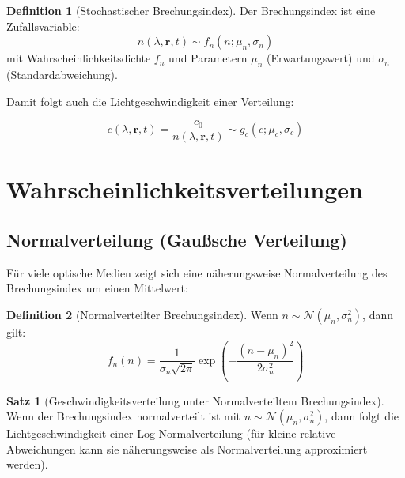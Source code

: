 \documentclass[12pt,a4paper,oneside]{article}
\theoremstyle{definition}
\newtheorem{definition}{Definition}[section]
\newtheorem{satz}{Satz}[section]
\theoremstyle{remark}
\newcommand{\cLight}{c}
\newcommand{\refIndex}{n}
\begin{document}
\begin{definition}[Stochastischer Brechungsindex]
Der Brechungsindex ist eine Zufallsvariable:
\begin{equation}
    \refIndex(\lambda, \mathbf{r}, t) \sim f_{\refIndex}(n; \mu_n, \sigma_n)
\end{equation}
mit Wahrscheinlichkeitsdichte $f_{\refIndex}$ und Parametern $\mu_n$ (Erwartungswert) und $\sigma_n$ (Standardabweichung).
\end{definition}

Damit folgt auch die Lichtgeschwindigkeit einer Verteilung:

\begin{equation}
    \cLight(\lambda, \mathbf{r}, t) = \frac{\cLight_0}{\refIndex(\lambda, \mathbf{r}, t)} \sim g_{\cLight}(c; \mu_c, \sigma_c)
\end{equation}

\section{Wahrscheinlichkeitsverteilungen}

\subsection{Normalverteilung (Gaußsche Verteilung)}

Für viele optische Medien zeigt sich eine näherungsweise Normalverteilung des Brechungsindex um einen Mittelwert:

\begin{definition}[Normalverteilter Brechungsindex]
Wenn $\refIndex \sim \mathcal{N}(\mu_n, \sigma_n^2)$, dann gilt:
\begin{equation}
    f_{\refIndex}(n) = \frac{1}{\sigma_n \sqrt{2\pi}} \exp\left(-\frac{(n-\mu_n)^2}{2\sigma_n^2}\right)
\end{equation}
\end{definition}

\begin{satz}[Geschwindigkeitsverteilung unter Normalverteiltem Brechungsindex]
Wenn der Brechungsindex normalverteilt ist mit $\refIndex \sim \mathcal{N}(\mu_n, \sigma_n^2)$, dann folgt die Lichtgeschwindigkeit einer Log-Normalverteilung (für kleine relative Abweichungen kann sie näherungsweise als Normalverteilung approximiert werden).
\end{satz}
\end{document}
